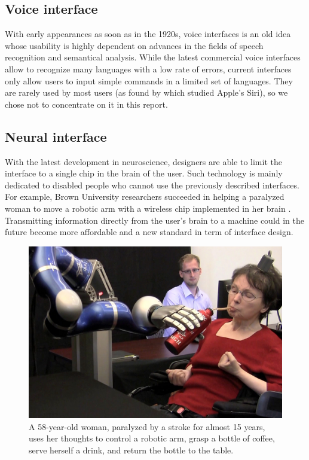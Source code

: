 \documentclass[a4paper,11pt] {article}
\theoremstyle{definition}
\begin{document}
    \subsection{Voice interface}

    With early appearances as soon as in the 1920s, voice interfaces is an old idea whose usability is highly dependent on advances in the fields of speech recognition and semantical analysis. While the latest commercial voice interfaces allow to recognize many languages with a low rate of errors, current interfaces only allow users to input simple commands in a limited set of languages. They are rarely used by most users (as found by \cite{SiriNotUsed} which studied Apple's Siri), so we chose not to concentrate on it in this report.

    \subsection{Neural interface}
    With the latest development in neuroscience, designers are able to limit the interface to a single chip in the brain of the user. Such technology is mainly dedicated to disabled people who cannot use the previously described interfaces. For example, Brown University researchers succeeded in helping a paralyzed woman to move a robotic arm with a wireless chip implemented in her brain \cite{brownRobotic}. Transmitting information directly from the user's brain to a machine could in the future become more affordable and a new standard in term of interface design.
    
    \begin{figure}[!h]
    \centering
    \includegraphics[scale=0.15]{fig-report/robotic-arm-brain.jpg}
    \caption{A 58-year-old woman, paralyzed by a stroke for almost 15 years, uses her thoughts to control a robotic arm, grasp a bottle of coffee, serve herself a drink, and return the bottle to the table\cite{brownEdu}.}
    \end{figure}
\end{document}
